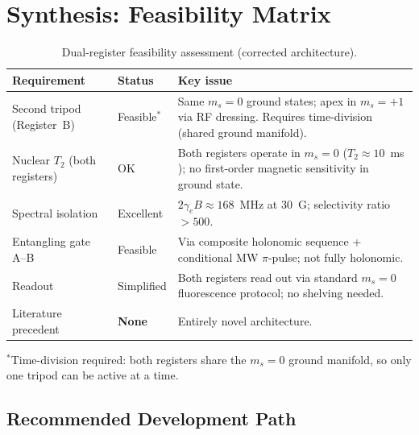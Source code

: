 \documentclass[11pt,letterpaper]{article}
\begin{document}
\medskip
\noindent{}

\section{Synthesis: Feasibility Matrix}
\label{sec:synthesis}

\begin{table}[H]
\centering
\caption{Dual-register feasibility assessment (corrected architecture).}
\label{tab:feasibility}
\begin{tabular}{@{}p{3.5cm}p{2cm}p{8cm}@{}}
\toprule
\textbf{Requirement} & \textbf{Status} & \textbf{Key issue} \\
\midrule
Second tripod (Register~B) & Feasible$^*$ & Same $m_s = 0$ ground states; apex in $m_s = +1$ via RF dressing. Requires time-division (shared ground manifold). \\
Nuclear $T_2$ (both registers) & OK & Both registers operate in $m_s = 0$ ($T_2 \approx 10$~ms \cite{Pfender2017}); no first-order magnetic sensitivity in ground state. \\
Spectral isolation & Excellent & $2\gamma_e B \approx 168$~MHz at 30~G; selectivity ratio $> 500$. \\
Entangling gate A--B & Feasible & Via composite holonomic sequence + conditional MW $\pi$-pulse; not fully holonomic. \\
Readout & Simplified & Both registers read out via standard $m_s = 0$ fluorescence protocol; no shelving needed. \\
Literature precedent & \textbf{None} & Entirely novel architecture. \\
\bottomrule
\end{tabular}
\end{table}

\noindent $^*$Time-division required: both registers share the $m_s = 0$ ground manifold, so only one tripod can be active at a time.

\subsection{Recommended Development Path}
\end{document}
